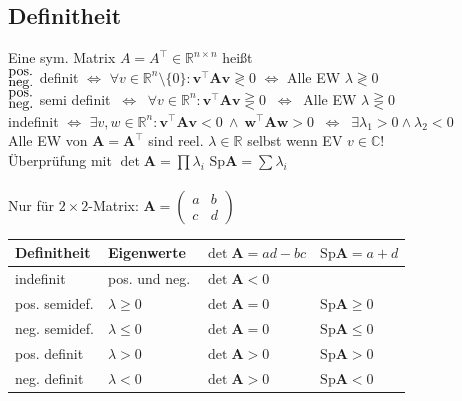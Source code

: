 \documentclass[6pt,a4paper]{scrartcl}
\newcommand{\eset}[1]{\ensuremath{\bigl\{#1\bigr\}}}											%
\newcommand{\ma}[1]{\ensuremath{\boldsymbol {#1}}}												%
\renewcommand{\vec}[1]{\ensuremath{\boldsymbol {#1}}}											%
\begin{document}
\begin{multicols*}{4}
\subsection{Definitheit}
Eine sym. Matrix $A = A^\top \in \mathbb R^{n\times n}$ heißt\\[0.3em]
$_{\text{\normalsize neg.}}^{\text{\normalsize pos.}}$ definit 
$ \Leftrightarrow$
$\forall v \in \mathbb R^n \setminus \eset{0} : \vec v^\top \ma A \vec v \gtrless 0$
$ \Leftrightarrow  $  Alle EW $\lambda \gtrless 0$\\
$_{\text{\normalsize neg.}}^{\text{\normalsize pos.}}$ semi definit $\ \Leftrightarrow\ $ $\forall v \in \mathbb R^n : \vec v^\top \ma A \vec v \gtreqless 0$ $\ \Leftrightarrow \ $  Alle EW $\lambda \gtreqless 0$\\
indefinit $\Leftrightarrow$
$\exists v,w \in \mathbb R^n: \vec v^\top
\ma A \vec v < 0 \ \land \ \vec w^\top \ma A \vec w > 0$ 
$\ \Leftrightarrow \ $  $\exists \lambda_1 > 0 \land \lambda_2 < 0$\\
Alle EW von $\ma A = \ma A^\top$ sind reel. $\lambda \in \mathbb R$ selbst wenn EV $v \in \mathbb C$!\\
Überprüfung mit $\det \ma A = \prod \lambda_i$ \qquad $\mathrm{Sp} \ma A = \sum \lambda_i$\\ \\

Nur für $2\times 2$-Matrix: $\ma A = \begin{pmatrix}a & b \\ c & d\end{pmatrix}$ \\
\setlength{\tabcolsep}{0.5em} %
\begin{tabular}{|l|l|l|l|} 
	\hline \textbf{Definitheit} & \textbf{Eigenwerte} & $\det \ma A = ad - bc$ & $\mathrm{Sp} \ma A = a+d$ \\ 
	\hline indefinit & pos. und neg. & $\det \ma A < 0$ & \\ 
	\hline pos. semidef. & $\lambda \ge 0 $ & $\det \ma A = 0$  & $\mathrm{Sp} \ma A \ge 0$\\ 
	\hline neg. semidef. & $\lambda \le 0 $ & $\det \ma A = 0$  & $\mathrm{Sp} \ma A \le 0$\\ 
	\hline pos. definit & $\lambda > 0 $ & $\det \ma A > 0$  & $\mathrm{Sp} \ma A > 0$\\ 
	\hline neg. definit & $\lambda < 0 $ & $\det \ma A > 0$  & $\mathrm{Sp} \ma A < 0$\\ 
	\hline 
\end{tabular} 


\end{multicols*}
\end{document}

